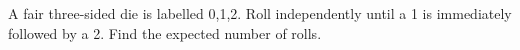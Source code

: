 A fair three-sided die is labelled 0,1,2. Roll independently until a 1 is immediately followed by a 2. Find the expected number of rolls.
